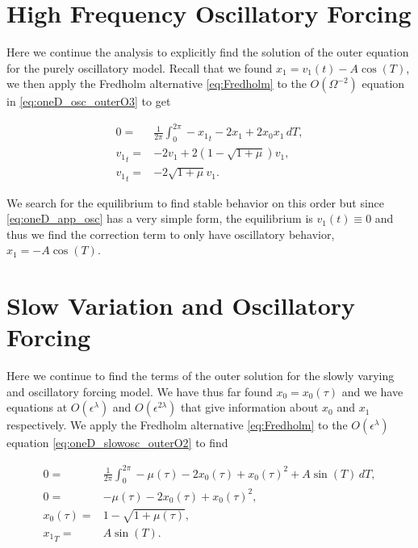 \section*{High Frequency Oscillatory Forcing}

Here we continue the analysis to explicitly find the solution of the outer equation for the purely oscillatory model. Recall that we found $x_1 = v_1(t)-A\cos(T)$, we then apply the Fredholm alternative \eqref{eq:Fredholm} to the $O(\Omega^{-2})$ equation in \eqref{eq:oneD_osc_outerO3} to get

\begin{equation}\label{eq:oneD_app_osc}
\begin{aligned}
0=&\frac{1}{2\pi}\int_0^{2\pi}-{x_1}_t-2x_1+2x_0x_1\, dT,\\
{v_1}_t=& -2v_1+2(1-\sqrt{1+\mu})v_1,\\
{v_1}_t=& -2\sqrt{1+\mu}v_1.
\end{aligned}
\end{equation}

We search for the equilibrium to find stable behavior on this order but since \eqref{eq:oneD_app_osc} has a very simple form, the equilibrium is $v_1(t)\equiv 0$ and thus we find the correction term to only have oscillatory behavior, $x_1=-A\cos(T)$.

\section*{Slow Variation and Oscillatory Forcing}

Here we continue to find the terms of the outer solution for the slowly varying and oscillatory forcing model. We have thus far found $x_0=x_0(\tau)$ and we have equations at $O(\epsilon^\lambda)$ and $O(\epsilon^{2\lambda})$ that give information about $x_0$ and $x_1$ respectively. We apply the Fredholm alternative \eqref{eq:Fredholm} to the $O(\epsilon^\lambda)$ equation \eqref{eq:oneD_slowosc_outerO2} to find

\begin{equation}\label{eq:oneD_app_slowosc1}
\begin{aligned}
0 = & \frac{1}{2\pi}\int_0^{2\pi} -\mu(\tau) -2x_0(\tau)+x_0(\tau)^2+A\sin(T)\,dT,\\
0=&-\mu(\tau)-2x_0(\tau)+x_0(\tau)^2,\\
x_0(\tau) =& 1-\sqrt{1+\mu(\tau)},\\
{x_1}_T = & A\sin(T).
\end{aligned}
\end{equation}

